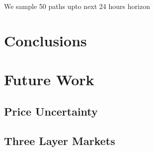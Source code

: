 \documentclass[11pt,twoside]{article}
\begin{document}
We sample 50 paths upto next 24 hours horizon
\section{Conclusions}

\section{Future Work}

\subsection{Price Uncertainty}

\subsection{Three Layer Markets}




\end{document}
